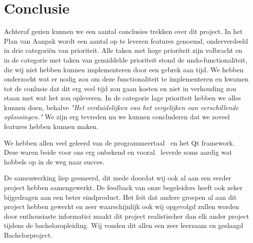 \section{Conclusie}
Achteraf gezien kunnen we een aantal conclusies trekken over dit project. In het Plan van Aanpak wordt een aantal op te leveren features genoemd, onderverdeeld in drie categori\"en van prioriteit. Alle taken met hoge prioriteit zijn volbracht en in de categorie met taken van gemiddelde prioriteit stond de undo-functionaliteit, die wij niet hebben kunnen implementeren door een gebrek aan tijd. We hebben onderzocht wat er nodig zou om deze functionaliteit te \"implementeren en kwamen tot de conlusie dat dit erg veel tijd zou gaan kosten en niet in verhouding zou staan met wat het zou opleveren. In de categorie lage prioriteit hebben we alles kunnen doen, behalve \emph{"Het verduidelijken van het vergelijken van verschillende oplossingen."} We zijn erg tevreden nu we kunnen concluderen dat we zoveel features hebben kunnen maken.

We hebben allen veel geleerd van de programmeertaal \cpp\ en het Qt framework. Deze waren beide voor ons erg onbekend en vooral \cpp\ leverde soms aardig wat hobbels op in de weg naar succes. 

De samenwerking liep gesmeerd, dit mede doordat wij ook al aan een eerder project hebben samengewerkt. De feedback van onze begeleiders heeft ook zeker bijgedragen aan een beter eindproduct. Het feit dat andere groepen al aan dit project hebben gewerkt en zeer waarschijnlijk ook wij opgevolgd zullen worden door enthousiaste informatici maakt dit project realistischer dan elk ander project tijdens de bacheloropleiding. Wij vonden dit allen een zeer leerzaam en geslaagd Bachelorproject.

